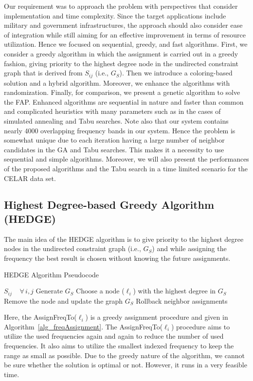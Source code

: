 \documentclass[10pt,twocolumn,twoside]{JCNtran}
\newcommand{\tbirkan}[1]{#1}
\newcommand{\linkl}{\ell}
\newcommand{\constraintGraph}{G_{S}}
\newcommand{\freqsepQuantized}[2]{S_{#1#2}}
\begin{document}
\tbirkan{Our requirement was to approach the problem with perspectives that consider implementation and time complexity. Since the target applications include military and government infrastructures, the approach should also consider ease of integration while still aiming for an effective improvement in terms of resource utilization. Hence we focused on sequential, greedy, and fast algorithms.} First, we consider a greedy algorithm in which the assignment is carried out in a greedy fashion, giving priority to the highest degree node in the undirected constraint graph that is derived from $\freqsepQuantized{i}{j}$ (i.e., $\constraintGraph$). Then we introduce a coloring-based solution and a hybrid algorithm. Moreover, we enhance the algorithms with randomization. Finally, for comparison, we present a genetic algorithm to solve the FAP. \tbirkan{Enhanced algorithms are sequential in nature and faster than common and complicated heuristics with many parameters such as in the cases of simulated annealing and Tabu searches. Note also that our system contains nearly 4000 overlapping frequency bands in our system. Hence the problem is somewhat unique due to each iteration having a large number of neighbor candidates in the GA and Tabu searches. This makes it a necessity to use sequential and simple algorithms. Moreover, we will also present the performances of the proposed algorithms and the Tabu search in a time limited scenario for the CELAR data set. }



\subsection{Highest Degree-based Greedy Algorithm (HEDGE)}
\label{subsec_hedge}
The main idea of the HEDGE algorithm is to give priority to the highest degree nodes in the undirected constraint graph (i.e., $\constraintGraph$) and while assigning the frequency the best result is chosen without knowing the future assignments. 
\begin{algorithm}
\caption{HEDGE Algorithm Pseudocode}
\begin{algorithmic}[1]
\REQUIRE $\freqsepQuantized{i}{j} \;\;\;\; \forall \, i,j$
\STATE Generate $\constraintGraph$ 
	\STATE Choose a node ($\linkl_i$) with the highest degree in $\constraintGraph$
	\IF{AssignFreqTo($\linkl_i$)}
		\STATE Remove the node and update the graph $\constraintGraph$
	\ELSE
		\STATE Rollback neighbor assignments
	\ENDIF
\ENDWHILE
\end{algorithmic}
\end{algorithm}
Here, the AssignFreqTo($\linkl_i$) is a greedy assignment procedure and given in Algorithm~\ref{alg_freqAssignment}. The AssignFreqTo($\linkl_i$) procedure aims to utilize the used frequencies again and again to reduce the number of used frequencies. It also aims to utilize the smallest indexed frequency to keep the range as small as possible. Due to the greedy nature of the algorithm, we cannot be sure whether the solution is optimal or not. However, it runs in a very feasible time. 
\end{document}
